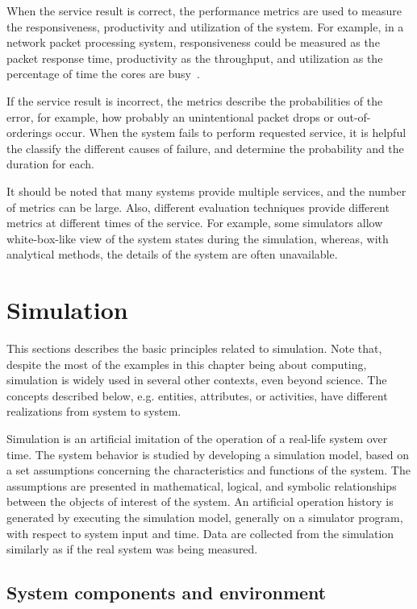 When the service result is correct, the performance metrics are used to measure the responsiveness, productivity and utilization of the system. For example, in a network packet processing system, responsiveness could be measured as the packet response time, productivity as the throughput, and utilization as the percentage of time the cores are busy~\cite{cavium:2010:fundamentals}.~\cite{jain:1991:AOCSPA}

If the service result is incorrect, the metrics describe the probabilities of the error, for example, how probably an unintentional packet drops or out-of-orderings occur. When the system fails to perform requested service, it is helpful the classify the different causes of failure, and determine the probability and the duration for each.~\cite{jain:1991:AOCSPA}

It should be noted that many systems provide multiple services, and the number of metrics can be large. Also, different evaluation techniques provide different metrics at different times of the service. For example, some simulators allow white-box-like view of the system states during the simulation, whereas, with analytical methods, the details of the system are often unavailable.~\cite{jain:1991:AOCSPA}~\cite{TODO: find reference for the white-box black-box stuff}

\section{Simulation}
This sections describes the basic principles related to simulation. Note that, despite the most of the examples in this chapter being about computing, simulation is widely used in several other contexts, even beyond science. The concepts described below, e.g. entities, attributes, or activities, have different realizations from system to system.

Simulation is an artificial imitation of the operation of a real-life system over time. The system behavior is studied by developing a simulation model, based on a set assumptions concerning the characteristics and functions of the system. The assumptions are presented in mathematical, logical, and symbolic relationships between the objects of interest of the system. An artificial operation history is generated by executing the simulation model, generally on a simulator program, with respect to system input and time. Data are collected from the simulation similarly as if the real system was being measured.

\subsection{System components and environment}
\label{sec:syst-comp-envir}

